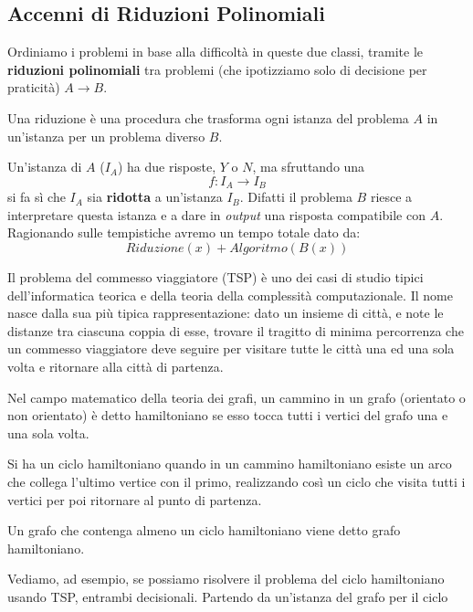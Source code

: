 \subsection{Accenni di Riduzioni Polinomiali}
Ordiniamo i problemi in base alla difficoltà in queste due classi, tramite le
\textbf{riduzioni polinomiali} tra problemi (che ipotizziamo solo di decisione per praticità) $A\to B$.
\begin{definizione}
  Una riduzione è una procedura che trasforma ogni istanza del problema $A$ in un'istanza per un problema diverso $B$.
\end{definizione}
Un'istanza di $A$ ($I_A$) ha due risposte, $Y$ o $N$, ma sfruttando una \[f:I_A\to I_B\] si fa sì che $I_A$ sia \textbf{ridotta} a un'istanza $I_B$. Difatti il problema $B$ riesce a interpretare questa istanza e a dare in \textit{output} una risposta compatibile con $A$.\\ Ragionando sulle tempistiche avremo un tempo totale dato da:
\[Riduzione(x) + Algoritmo(B(x))\]
\begin{definizione}[TSP]
  Il problema del commesso viaggiatore (TSP) è uno dei casi di studio tipici dell'informatica teorica e della teoria della complessità computazionale. Il nome nasce dalla sua più tipica rappresentazione: dato un insieme di città, e note le distanze tra ciascuna coppia di esse, trovare il tragitto di minima percorrenza che un commesso viaggiatore deve seguire per visitare tutte le città una ed una sola volta e ritornare alla città di partenza. 
\end{definizione}
\begin{definizione}
  Nel campo matematico della teoria dei grafi, un cammino in un grafo (orientato o non orientato) è detto hamiltoniano se esso tocca tutti i vertici del grafo una e una sola volta.
  \begin{corollario}
  Si ha un ciclo hamiltoniano quando in un cammino hamiltoniano esiste un arco che collega l'ultimo vertice con il primo, realizzando così un ciclo che visita tutti i vertici per poi ritornare al punto di partenza. 
  \end{corollario}
  \begin{corollario}
  Un grafo che contenga almeno un ciclo hamiltoniano viene detto grafo hamiltoniano. 
  \end{corollario}
\end{definizione}
Vediamo, ad esempio, se possiamo risolvere il problema del ciclo hamiltoniano
usando TSP, entrambi decisionali. Partendo da un'istanza del grafo per il ciclo
